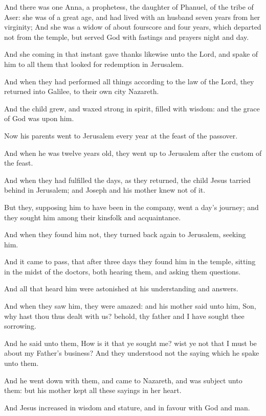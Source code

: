 \verse And there was one Anna, a prophetess, the daughter of Phanuel, of the tribe of Aser: she was of a great age, and had lived with an husband seven years from her virginity; \verse And she was a widow of about fourscore and four years, which departed not from the temple, but served God with fastings and prayers night and day.

\verse And she coming in that instant gave thanks likewise unto the Lord, and spake of him to all them that looked for redemption in Jerusalem.

\verse And when they had performed all things according to the law of the Lord, they returned into Galilee, to their own city Nazareth.

\verse And the child grew, and waxed strong in spirit, filled with wisdom: and the grace of God was upon him.

\verse Now his parents went to Jerusalem every year at the feast of the passover.

\verse And when he was twelve years old, they went up to Jerusalem after the custom of the feast.

\verse And when they had fulfilled the days, as they returned, the child Jesus tarried behind in Jerusalem; and Joseph and his mother knew not of it.

\verse But they, supposing him to have been in the company, went a day's journey; and they sought him among their kinsfolk and acquaintance.

\verse And when they found him not, they turned back again to Jerusalem, seeking him.

\verse And it came to pass, that after three days they found him in the temple, sitting in the midst of the doctors, both hearing them, and asking them questions.

\verse And all that heard him were astonished at his understanding and answers.

\verse And when they saw him, they were amazed: and his mother said unto him, Son, why hast thou thus dealt with us? behold, thy father and I have sought thee sorrowing.

\verse And he said unto them, How is it that ye sought me? wist ye not that I must be about my Father's business?  \verse And they understood not the saying which he spake unto them.

\verse And he went down with them, and came to Nazareth, and was subject unto them: but his mother kept all these sayings in her heart.

\verse And Jesus increased in wisdom and stature, and in favour with God and man.


